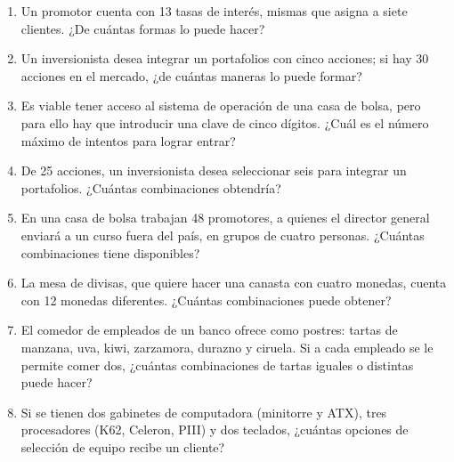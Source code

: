 \begin{Ejer}
\begin{enumerate}
\item Un promotor cuenta con 13 tasas de inter\'es, mismas que asigna a siete clientes. ¿De cu\'antas formas lo puede hacer?

\item Un inversionista desea integrar un portafolios con cinco acciones; si hay 30 acciones en el mercado, ¿de cu\'antas maneras lo puede formar?

\item Es viable tener acceso al sistema de operaci\'on de una casa de bolsa, pero para ello hay que introducir una clave de cinco d\'igitos. ¿Cu\'al es el n\'umero m\'aximo de intentos para lograr entrar?

\item De 25 acciones, un inversionista desea seleccionar seis para integrar un portafolios. ¿Cu\'antas combinaciones obtendr\'ia?

\item En una casa de bolsa trabajan 48 promotores, a quienes el director general enviar\'a a un curso fuera del pa\'is, en grupos de cuatro personas. ¿Cu\'antas combinaciones tiene disponibles?

\item La mesa de divisas, que quiere hacer una canasta con cuatro monedas, cuenta con 12 monedas diferentes. ¿Cu\'antas combinaciones puede obtener?

\item El comedor de empleados de un banco ofrece como postres: tartas de manzana, uva, kiwi, zarzamora, durazno y ciruela. Si a cada empleado se le permite comer dos, ¿cu\'antas combinaciones de tartas iguales o distintas puede hacer?

\item Si se tienen dos gabinetes de computadora (minitorre y ATX), tres procesadores (K62, Celeron, PIII) y dos teclados, ¿cu\'antas opciones de selecci\'on de equipo recibe un cliente?

\end{enumerate}
\end{Ejer}

